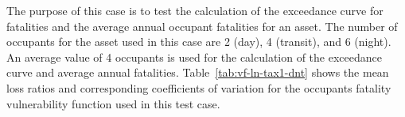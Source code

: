 The purpose of this case is to test the calculation of the exceedance curve for fatalities and the average annual occupant fatalities for an asset. The number of occupants for the asset used in this case are 2 (day), 4 (transit), and 6 (night). An average value of 4 occupants is used for the calculation of the exceedance curve and average annual fatalities. Table~\ref{tab:vf-ln-tax1-dnt} shows the mean loss ratios and corresponding coefficients of variation for the occupants fatality vulnerability function used in this test case.